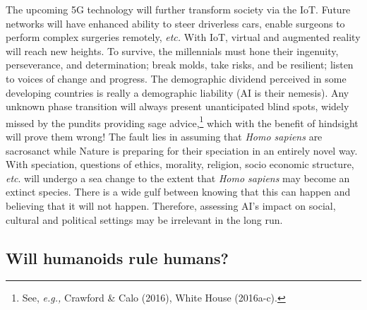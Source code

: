 \begin{multicols}{2}
The upcoming 5G technology will further transform society via the IoT. Future networks will have enhanced ability to steer driverless cars, enable surgeons to perform complex surgeries remotely, \textit{etc.} With IoT, virtual and augmented reality will reach new heights. To survive, the millennials must hone their ingenuity, perseverance, and determination; break molds, take risks, and be resilient; listen to voices of change and progress. The demographic dividend perceived in some developing countries is really a demographic liability (AI is their nemesis). Any unknown phase transition will always present unanticipated blind spots, widely missed by the pundits providing sage advice,\footnote{See, \textit{e.g.,} Crawford \& Calo (2016), White House (2016a-c).}  which with the benefit of hindsight will prove them wrong! The fault lies in assuming that \textit{Homo sapiens} are sacrosanct while Nature is preparing for their speciation in an entirely novel way. With speciation, questions of ethics, morality, religion, socio economic structure, \textit{etc}. will undergo a sea change to the extent that \textit{Homo sapiens} may become an extinct species. There is a wide gulf between knowing that this can happen and believing that it will not happen. Therefore, assessing AI's impact on social, cultural and political settings may be irrelevant in the long run.\\[-15pt]

\subsection{Will humanoids rule humans?}

\vskip -5pt


\end{multicols}
